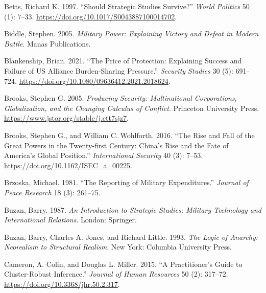 \documentclass[
  12,
  letterpaper,
  DIV=11,
  numbers=noendperiod]{scrartcl}
\newlength{\cslhangindent}
\newlength{\cslentryspacingunit} %
\newenvironment{CSLReferences}[2] %
 {%
  \setlength{\parindent}{0pt}
  \ifodd #1
  \let\oldpar\par
  \def\par{\hangindent=\cslhangindent\oldpar}
  \fi
  \setlength{\parskip}{#2\cslentryspacingunit}
 }%
 {}
\begin{document}
\begin{CSLReferences}{1}{0}
\leavevmode{}%
Betts, Richard K. 1997. {``Should {Strategic Studies Survive}?''}
\emph{World Politics} 50 (1): 7--33.
\url{https://doi.org/10.1017/S0043887100014702}.

\leavevmode{}%
Biddle, Stephen. 2005. \emph{Military {Power}: {Explaining Victory} and
{Defeat} in {Modern Battle}}. {Manas Publications}.

\leavevmode{}%
Blankenship, Brian. 2021. {``The {Price} of {Protection}: {Explaining
Success} and {Failure} of {US Alliance Burden-Sharing Pressure}.''}
\emph{Security Studies} 30 (5): 691--724.
\url{https://doi.org/10.1080/09636412.2021.2018624}.

\leavevmode{}%
Brooks, Stephen G. 2005. \emph{Producing {Security}: {Multinational
Corporations}, {Globalization}, and the {Changing Calculus} of
{Conflict}}. {Princeton University Press}.
\url{https://www.jstor.org/stable/j.ctt7sjz7}.

\leavevmode{}%
Brooks, Stephen G., and William C. Wohlforth. 2016. {``The {Rise} and
{Fall} of the {Great Powers} in the {Twenty-first Century}: {China}'s
{Rise} and the {Fate} of {America}'s {Global Position}.''}
\emph{International Security} 40 (3): 7--53.
\url{https://doi.org/10.1162/ISEC_a_00225}.

\leavevmode{}%
Brzoska, Michael. 1981. {``The Reporting of Military Expenditures.''}
\emph{Journal of Peace Research} 18 (3): 261--75.

\leavevmode{}%
Buzan, Barry. 1987. \emph{An {Introduction} to {Strategic Studies}:
{Military Technology} and {International Relations}}. {London}:
{Springer}.

\leavevmode{}%
Buzan, Barry, Charles A. Jones, and Richard Little. 1993. \emph{The
{Logic} of {Anarchy}: {Neorealism} to {Structural Realism}}. {New York}:
{Columbia University Press}.

\leavevmode{}%
Cameron, A. Colin, and Douglas L. Miller. 2015. {``A {Practitioner}'s
{Guide} to {Cluster-Robust Inference}.''} \emph{Journal of Human
Resources} 50 (2): 317--72. \url{https://doi.org/10.3368/jhr.50.2.317}.


\end{CSLReferences}
\end{document}
